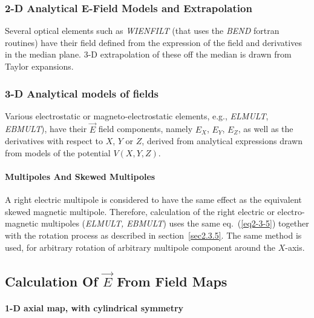 \subsubsection{2-D Analytical E-Field Models and Extrapolation} 

Several optical elements such as \textsl{WIENFILT} (that 
uses the \textsl{BEND} fortran routines) 
have their field defined from the  expression of the field and derivatives in the median plane. 
3-D extrapolation of these off the median is drawn from Taylor expansions. 





\subsubsection{3-D Analytical models of fields} \label{sec2.5.3}

 Various electrostatic or magneto-electrostatic  elements, e.g.,   \textsl{ELMULT},
  \textsl{EBMULT}), have their $ \vec  E$ field 
components,  namely $ E_X $, $ E_Y $, $ E_Z $, as well as the 
derivatives with respect to $ X$, $Y $ or $ Z $,  derived 
from  analytical expressions  drawn from  models of the potential $ V(X,Y,Z)$. 






\paragraph{Multipoles And Skewed Multipoles}

\noindent A right electric multipole is considered to have the same effect 
as the equivalent skewed magnetic multipole. Therefore, 
calculation of the right electric or electro-magnetic multipoles 
(\textsl{ELMULT, EBMULT})   uses the 
same eq.~(\ref{eq2-3-5}) together with the rotation process as described in 
section~\ref{sec2.3.5}. The same method is used, for arbitrary rotation of 
arbitrary multipole component around the $ X $-axis. 



\subsection{Calculation Of  $ \vec E$ From Field Maps} \label{sec2.6}

\paragraph{1-D axial map, with cylindrical symmetry} 

